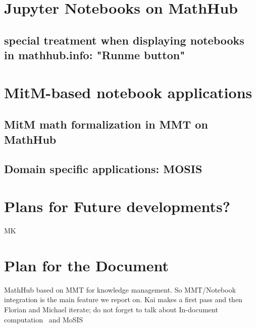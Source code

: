 \documentclass[book]{deliverablereport}
\begin{document}
\section{Jupyter Notebooks on MathHub}
\subsection{special treatment when displaying notebooks in mathhub.info: "Runme button"}

\section{MitM-based notebook applications}
\subsection{MitM math formalization in MMT on MathHub}
\subsection{Domain specific applications: MOSIS}

\section{Plans for Future developments?}

\begin{oldpart}{MK}
  \section{Plan for the Document}
MathHub based on MMT for knowledge management. So MMT/Notebook integration is the main
feature we report on. Kai makes a first pass and then Florian and Michael iterate; do not
forget to talk about In-document computation~\cite{ODK-D4.9} and
MoSIS~\cite{PolKohKoe:kacse18}
\end{oldpart}

\printbibliography
\end{document}
